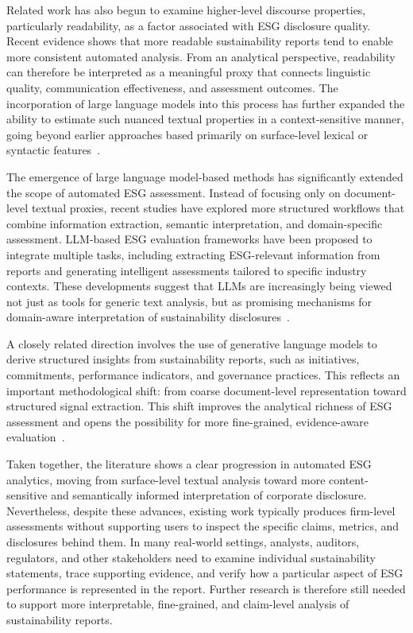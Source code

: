 \documentclass[sn-mathphys, oneside]{sn-jnl}
\begin{document}
Related work has also begun to examine higher-level discourse properties, particularly readability, as a factor associated with ESG disclosure quality. Recent evidence shows that more readable sustainability reports tend to enable more consistent automated analysis. From an analytical perspective, readability can therefore be interpreted as a meaningful proxy that connects linguistic quality, communication effectiveness, and assessment outcomes. The incorporation of large language models into this process has further expanded the ability to estimate such nuanced textual properties in a context-sensitive manner, going beyond earlier approaches based primarily on surface-level lexical or syntactic features~\cite{shimamura2025readability}.

The emergence of large language model-based methods has significantly extended the scope of automated ESG assessment. Instead of focusing only on document-level textual proxies, recent studies have explored more structured workflows that combine information extraction, semantic interpretation, and domain-specific assessment. LLM-based ESG evaluation frameworks have been proposed to integrate multiple tasks, including extracting ESG-relevant information from reports and generating intelligent assessments tailored to specific industry contexts. These developments suggest that LLMs are increasingly being viewed not just as tools for generic text analysis, but as promising mechanisms for domain-aware interpretation of sustainability disclosures~\cite{cai2025esg}.

A closely related direction involves the use of generative language models to derive structured insights from sustainability reports, such as initiatives, commitments, performance indicators, and governance practices. This reflects an important methodological shift: from coarse document-level representation toward structured signal extraction. This shift improves the analytical richness of ESG assessment and opens the possibility for more fine-grained, evidence-aware evaluation~\cite{bronzini2024glitter}.

Taken together, the literature shows a clear progression in automated ESG analytics, moving from surface-level textual analysis toward more content-sensitive and semantically informed interpretation of corporate disclosure. Nevertheless, despite these advances, existing work typically produces firm-level assessments without supporting users to inspect the specific claims, metrics, and disclosures behind them. In many real-world settings, analysts, auditors, regulators, and other stakeholders need to examine individual sustainability statements, trace supporting evidence, and verify how a particular aspect of ESG performance is represented in the report. Further research is therefore still needed to support more interpretable, fine-grained, and claim-level analysis of sustainability reports.
\end{document}

